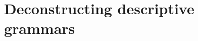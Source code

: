 \documentclass{article}
\begin{document}
\chapter{Deconstructing descriptive grammars}



\end{document}
